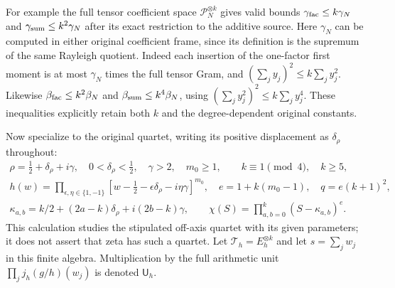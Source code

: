 \documentclass[11pt]{article}
\theoremstyle{remark}\newtheorem{remark}[theorem]{Remark}
\begin{document}
For example the full tensor coefficient space
$\mathcal P_N^{\otimes k}$ gives valid bounds
$\gamma_{\rm fac}\leq k\gamma_N$ and
$\gamma_{\rm sum}\leq k^2\gamma_N$ after its exact restriction to
the additive source.  Here $\gamma_N$ can be computed in either
original coefficient frame, since its definition is the supremum
of the same Rayleigh quotient.  Indeed each insertion of the
one-factor first moment is at most $\gamma_N$ times the full tensor
Gram, and $(\sum_jy_j)^2\leq k\sum_jy_j^2$.  Likewise
$\beta_{\rm fac}\leq k^2\beta_N$ and
$\beta_{\rm sum}\leq k^4\beta_N$, using
$(\sum_jy_j^2)^2\leq k\sum_jy_j^4$.  These inequalities explicitly
retain both $k$ and the degree-dependent original constants.

Now specialize to the original quartet, writing its positive
displacement as $\delta_\rho$ throughout:
\begin{equation}\tag{GM23}
 \begin{gathered}
 \rho=\tfrac12+\delta_\rho+i\gamma,\quad
 0<\delta_\rho<\tfrac12,\quad\gamma>2,\quad m_0\geq1,\qquad
 k\equiv1\pmod4,\quad k\geq5,\\
 h(w)=\prod_{\epsilon,\eta\in\{1,-1\}}
       [w-\tfrac12-\epsilon\delta_\rho-i\eta\gamma]^{m_0},
 \quad e=1+k(m_0-1),\quad q=e(k+1)^2,\\
 \kappa_{a,b}=k/2+(2a-k)\delta_\rho+i(2b-k)\gamma,\qquad
 \chi(S)=\prod_{a,b=0}^k(S-\kappa_{a,b})^e.
 \end{gathered}
\end{equation}
This calculation studies the stipulated off-axis quartet with its
given parameters; it does not assert that zeta has such a quartet.
Let $\mathcal T_h=E_h^{\otimes k}$ and let $s=\sum_jw_j$ in this
finite algebra.  Multiplication by the full arithmetic unit
$\prod_j j_h(g/h)(w_j)$ is denoted $\mathsf U_h$.
\end{document}
